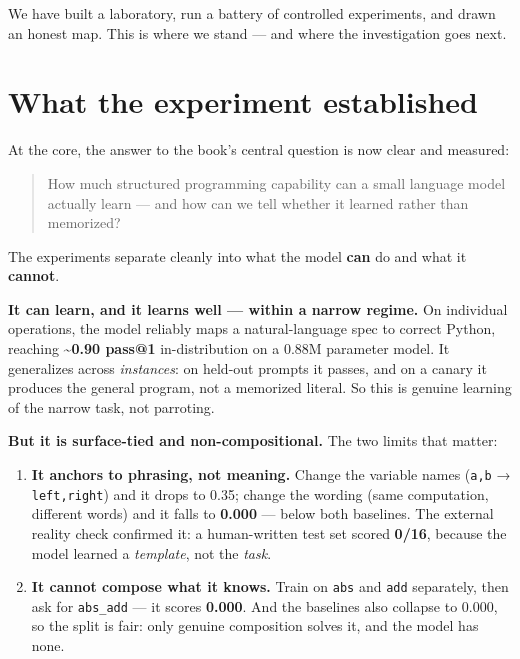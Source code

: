 We have built a laboratory, run a battery of controlled experiments, and
drawn an honest map. This is where we stand --- and where the
investigation goes next.

\section{What the experiment
established}\label{what-the-experiment-established}

At the core, the answer to the book's central question is now clear and
measured:

\begin{quote}
How much structured programming capability can a small language model
actually learn --- and how can we tell whether it learned rather than
memorized?
\end{quote}

The experiments separate cleanly into what the model \textbf{can} do and
what it \textbf{cannot}.

\textbf{It can learn, and it learns well --- within a narrow regime.} On
individual operations, the model reliably maps a natural-language spec
to correct Python, reaching \textbf{\textasciitilde0.90 pass@1}
in-distribution on a 0.88M parameter model. It generalizes across
\emph{instances}: on held-out prompts it passes, and on a canary it
produces the general program, not a memorized literal. So this is
genuine learning of the narrow task, not parroting.

\textbf{But it is surface-tied and non-compositional.} The two limits
that matter:

\begin{enumerate}
\def\labelenumi{\arabic{enumi}.}
\item
  \textbf{It anchors to phrasing, not meaning.} Change the variable
  names (\texttt{a,b} → \texttt{left,right}) and it drops to 0.35;
  change the wording (same computation, different words) and it falls to
  \textbf{0.000} --- below both baselines. The external reality check
  confirmed it: a human-written test set scored \textbf{0/16}, because
  the model learned a \emph{template}, not the \emph{task}.
\item
  \textbf{It cannot compose what it knows.} Train on \texttt{abs} and
  \texttt{add} separately, then ask for \texttt{abs\_add} --- it scores
  \textbf{0.000}. And the baselines also collapse to 0.000, so the split
  is fair: only genuine composition solves it, and the model has none.
\end{enumerate}

